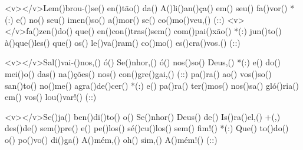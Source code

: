 <v></v>Lem()brou-()se() en()tão() da() A()li()an()ça() em() seu() fa()vor() *(:)
e() no() seu() imen()so() a()mor() se() co()mo()veu,() (::)
<v></v>fa()zen()do() que() en()con()tras()sem() com()pai()xão() *(:)
jun()to() à()que()les() que() os() le()va()ram() co()mo() es()cra()vos.() (::)

<v></v>Sal()vai-()nos,() ó() Se()nhor,() ó() nos()so() Deus,() *(:)
e() do() mei()o() das() na()ções() nos() con()gre()gai,() (::)
pa()ra() ao() vos()so() san()to() no()me() agra()de()cer() *(:)
e() pa()ra() ter()mos() nos()sa() gló()ria() em() vos() lou()var!() (::)

<v></v>Se()ja() ben()di()to() o() Se()nhor() Deus() de() Is()ra()el,() +(,)
des()de() sem()pre() e() pe()los() sé()cu()los() sem() fim!() *(:)
Que() to()do() o() po()vo() di()ga() A()mém,() oh() sim,() A()mém!() (::)